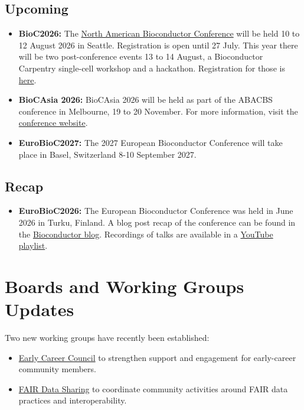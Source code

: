 \subsection{Upcoming}\label{upcoming}

\begin{itemize}
\tightlist
\item
  \textbf{BioC2026:} The \href{https://bioc2026.bioconductor.org/}{North American Bioconductor Conference} will be held 10 to 12 August 2026 in Seattle. Registration is open until 27 July. This year there will be two post-conference events 13 to 14 August, a Bioconductor Carpentry single-cell workshop and a hackathon. Registration for those is \href{https://bioc2026.bioconductor.org/post-conference/}{here}.
\item
  \textbf{BioCAsia 2026:} BioCAsia 2026 will be held as part of the ABACBS conference in Melbourne, 19 to 20 November. For more information, visit the \href{https://biocasia2026.bioconductor.org/}{conference website}.
\item
  \textbf{EuroBioC2027:} The 2027 European Bioconductor Conference will take place in Basel, Switzerland 8-10 September 2027.
\end{itemize}

\subsection{Recap}\label{recap}

\begin{itemize}
\tightlist
\item
  \textbf{EuroBioC2026:} The European Bioconductor Conference was held in June 2026 in Turku, Finland. A blog post recap of the conference can be found in the \href{https://blog.bioconductor.org/posts/2026-06-19-EuroBioc2026-recap/}{Bioconductor blog}. Recordings of talks are available in a \href{https://www.youtube.com/playlist?list=PLdl4u5ZRDMQSeTgs5bOmbGmSMWVZits14}{YouTube playlist}.
\end{itemize}

\section{Boards and Working Groups Updates}\label{boards-and-working-groups-updates}

Two new working groups have recently been established:

\begin{itemize}
\tightlist
\item
  \href{https://workinggroups.bioconductor.org/currently-active-working-groups-committees.html\#early-career-council}{Early Career Council} to strengthen support and engagement for early-career community members.
\item
  \href{https://workinggroups.bioconductor.org/currently-active-working-groups-committees.html\#fair-data-sharing}{FAIR Data Sharing} to coordinate community activities around FAIR data practices and interoperability.
\end{itemize}

